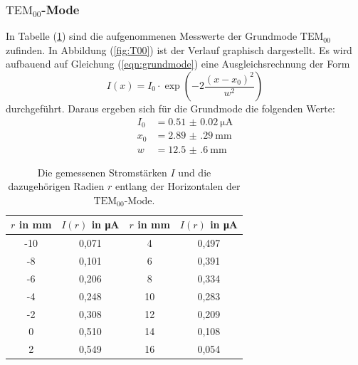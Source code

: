 \subsubsection{$\mathrm{TEM}_\mathrm{00}$-Mode}

In Tabelle (\ref{tab:T00}) sind die aufgenommenen Messwerte der Grundmode $\mathrm{TEM}_\mathrm{00}$ zufinden. In Abbildung (\ref{fig:T00}) ist der Verlauf graphisch dargestellt.
Es wird aufbauend auf Gleichung (\ref{eqn:grundmode}) eine Ausgleichsrechnung der Form
\begin{equation}
  I(x) = I_\mathrm{0} \cdot \exp\left(-2\frac{(x-x_\mathrm{0})^2}{w^2}\right)
\end{equation}
durchgeführt.
Daraus ergeben sich für die Grundmode die folgenden Werte:
\begin{align*}
I_\mathrm{0} &= \SI{0.51(2)}{\micro\ampere}\\
x_\mathrm{0} &= \SI{2.89(29)}{\milli\meter}\\
w &= \SI{12.5(6)}{\milli\meter}
\end{align*}

 \begin{table}
 	\centering
 	\caption{Die gemessenen Stromstärken $I$ und die dazugehörigen Radien $r$ entlang der Horizontalen der $\mathrm{TEM}_\mathrm{00}$-Mode.}
 	\label{tab:T00}
  \begin{tabular}{c c c c}
    \toprule
    $r$ in mm & $I(r)$ in \si{\micro\ampere} & $r$ in mm & $I(r)$ in \si{\micro\ampere} \\
    \midrule
     -10 & 0,071 & 4 & 0,497 \\
     -8 & 0,101 & 6 & 0,391 \\
     -6 & 0,206 & 8 & 0,334 \\
     -4 & 0,248 & 10 & 0,283 \\
     -2 & 0,308 & 12 & 0,209 \\
     0 & 0,510 & 14 & 0,108 \\
     2 & 0,549 & 16 & 0,054 \\
    \bottomrule
  \end{tabular}
 \end{table}

